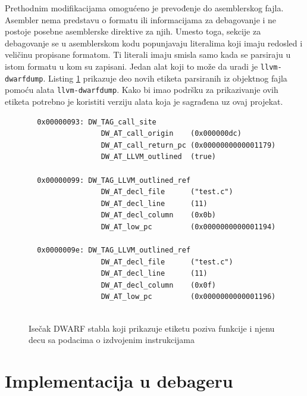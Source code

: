 \documentclass[12pt,oneside]{memoir}
\begin{document}
Prethodnim modifikacijama omogućeno je prevođenje do asemblerskog fajla.
Asembler nema predstavu o formatu ili informacijama za debagovanje i ne postoje posebne asemblerske direktive za njih.
Umesto toga, sekcije za debagovanje se u asemblerskom kodu popunjavaju literalima koji imaju redosled i veličinu propisane formatom.
Ti literali imaju smisla samo kada se parsiraju u istom formatu u kom su zapisani.
Jedan alat koji to može da uradi je \verb|llvm-dwarfdump|.
Listing \ref{lst:outlining_asm_example} prikazuje deo novih etiketa parsiranih iz objektnog fajla pomoću alata \verb|llvm-dwarfdump|.
Kako bi imao podršku za prikazivanje ovih etiketa potrebno je koristiti verziju alata koja je sagrađena uz ovaj projekat.

\begin{figure}[!ht]
\begin{verbatim}
  0x00000093: DW_TAG_call_site
                 DW_AT_call_origin    (0x000000dc)
                 DW_AT_call_return_pc (0x0000000000001179)
                 DW_AT_LLVM_outlined  (true)
  
  0x00000099: DW_TAG_LLVM_outlined_ref
                 DW_AT_decl_file      ("test.c")
                 DW_AT_decl_line      (11)
                 DW_AT_decl_column    (0x0b)
                 DW_AT_low_pc         (0x0000000000001194)
  
  0x0000009e: DW_TAG_LLVM_outlined_ref
                 DW_AT_decl_file      ("test.c")
                 DW_AT_decl_line      (11)
                 DW_AT_decl_column    (0x0f)
                 DW_AT_low_pc         (0x0000000000001196)
  
  \end{verbatim}
  \caption{Isečak DWARF stabla koji prikazuje etiketu poziva funkcije i njenu decu sa podacima o izdvojenim instrukcijama}
  \label{lst:outlining_asm_example}
\end{figure}

\section{Implementacija u debageru}

\label{sec:debugger_implementation}
\end{document}
